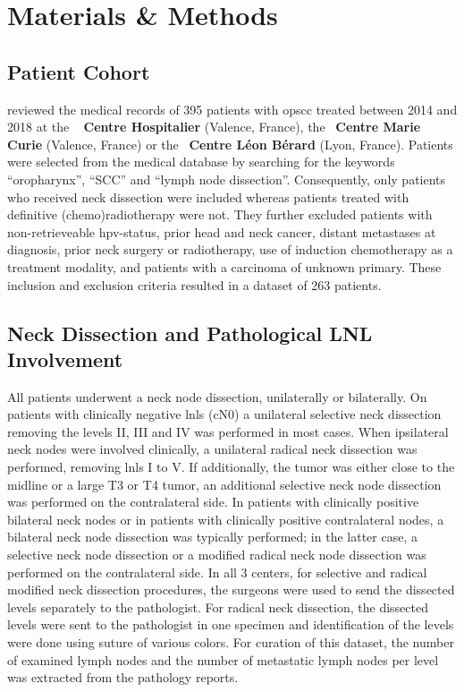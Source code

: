 \documentclass[\relativeRoot/main.tex]{subfiles}
\begin{document}
\section{Materials \& Methods}
\label{sec:dataset_clb:methods}

\subsection*{Patient Cohort}
\label{subsec:dataset_clb:methods:cohort}

 reviewed the medical records of 395 patients with \gls{opscc} treated between 2014 and 2018 at the ~\textbf{
Centre Hospitalier} (Valence, France), the ~\textbf{Centre Marie Curie} (Valence, France) or the ~\textbf{Centre Léon Bérard} (Lyon, France). Patients were selected from the medical database by searching for the keywords ``oropharynx'', ``SCC'' and ``lymph node dissection''. Consequently, only patients who received neck dissection were included whereas patients treated with definitive (chemo)radiotherapy were not. They further excluded patients with non-retrieveable \gls{hpv}-status, prior head and neck cancer, distant metastases at diagnosis, prior neck surgery or radiotherapy, use of induction chemotherapy as a treatment modality, and patients with a carcinoma of unknown primary. These inclusion and exclusion criteria resulted in a dataset of 263 patients.

\subsection*{Neck Dissection and Pathological LNL Involvement}
\label{subsec:dataset_clb:methods:dissection}

All patients underwent a neck node dissection, unilaterally or bilaterally. On patients with clinically negative \glspl{lnl} (cN0) a unilateral selective neck dissection removing the levels II, III and IV was performed in most cases. When ipsilateral neck nodes were involved clinically, a unilateral radical neck dissection was performed, removing \glspl{lnl} I to V. If additionally, the tumor was either close to the midline or a large T3 or T4 tumor, an additional selective neck node dissection was performed on the contralateral side. In patients with clinically positive bilateral neck nodes or in patients with clinically positive contralateral nodes, a bilateral neck node dissection was typically performed; in the latter case, a selective neck node dissection or a modified radical neck node dissection was performed on the contralateral side. In all 3 centers, for selective and radical modified neck dissection procedures, the surgeons were used to send the dissected levels separately to the pathologist. For radical neck dissection, the dissected levels were sent to the pathologist in one specimen and identification of the levels were done using suture of various colors. For curation of this dataset, the number of examined lymph nodes and the number of metastatic lymph nodes per level was extracted from the pathology reports.
\end{document}
